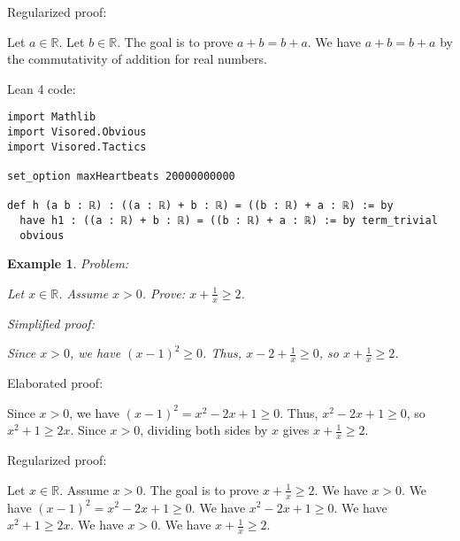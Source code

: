 \documentclass{article}
\newtheorem{example}{Example}
\begin{document}
Regularized proof:
\begin{tcolorbox}[colback=red!10, width=\linewidth]
Let $a\in\mathbb{R}$.
Let $b\in\mathbb{R}$.
The goal is to prove $a+b=b+a$.
We have $a+b=b+a$ by the commutativity of addition for real numbers.
\end{tcolorbox}

Lean 4 code:
\begin{tcolorbox}[colback=white!10, width=\linewidth]
\begin{lstlisting}[language=Lean4]
import Mathlib
import Visored.Obvious
import Visored.Tactics

set_option maxHeartbeats 20000000000

def h (a b : ℝ) : ((a : ℝ) + b : ℝ) = ((b : ℝ) + a : ℝ) := by
  have h1 : ((a : ℝ) + b : ℝ) = ((b : ℝ) + a : ℝ) := by term_trivial
  obvious

\end{lstlisting}
\end{tcolorbox}


\begin{example}
Problem:
\begin{tcolorbox}[colback=yellow!10, width=\linewidth]
Let $x\in\mathbb{R}$. Assume $x> 0$. Prove: $x + \frac{1}{x} \ge 2$.
\end{tcolorbox}

Simplified proof:
\begin{tcolorbox}[colback=blue!10, width=\linewidth]
Since $x>0$, we have $(x-1)^2 \ge 0$. Thus, $x - 2 + \frac{1}{x} \ge 0$, so $x + \frac{1}{x} \ge 2$.
\end{tcolorbox}
\end{example}

Elaborated proof:
\begin{tcolorbox}[colback=green!10, width=\linewidth]
Since $x>0$, we have $(x-1)^2 = x^2 - 2x + 1 \ge 0$. Thus, $x^2 - 2x + 1 \ge 0$, so $x^2 + 1 \ge 2x$. Since $x > 0$, dividing both sides by $x$ gives $x + \frac{1}{x} \ge 2$.
\end{tcolorbox}

Regularized proof:
\begin{tcolorbox}[colback=red!10, width=\linewidth]
Let $x\in\mathbb{R}$.
Assume $x>0$.
The goal is to prove $x + \frac{1}{x} \ge 2$.
We have $x>0$.
We have ${{(x-1)}}^2 = x^2 - 2x + 1 \ge 0$.
We have $x^2 - 2x + 1 \ge 0$.
We have $x^2 + 1 \ge 2x$.
We have $x > 0$.
We have $x + \frac{1}{x} \ge 2$.
\end{tcolorbox}
\end{document}
